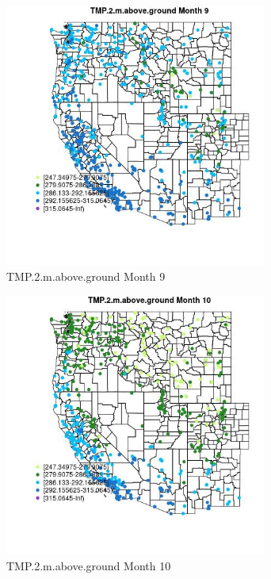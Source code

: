 \begin{figure} 
\centering  
\includegraphics[width=0.77\textwidth]{Code_Outputs/Report_ML_input_PM25_Step4_part_e_de_duplicated_aves_compiled_2019-05-14wNAs_MapObsMo9TMP2maboveground.jpg} 
\caption{\label{fig:Report_ML_input_PM25_Step4_part_e_de_duplicated_aves_compiled_2019-05-14wNAsMapObsMo9TMP2maboveground}TMP.2.m.above.ground Month 9} 
\end{figure} 
 

\begin{figure} 
\centering  
\includegraphics[width=0.77\textwidth]{Code_Outputs/Report_ML_input_PM25_Step4_part_e_de_duplicated_aves_compiled_2019-05-14wNAs_MapObsMo10TMP2maboveground.jpg} 
\caption{\label{fig:Report_ML_input_PM25_Step4_part_e_de_duplicated_aves_compiled_2019-05-14wNAsMapObsMo10TMP2maboveground}TMP.2.m.above.ground Month 10} 
\end{figure} 
 

